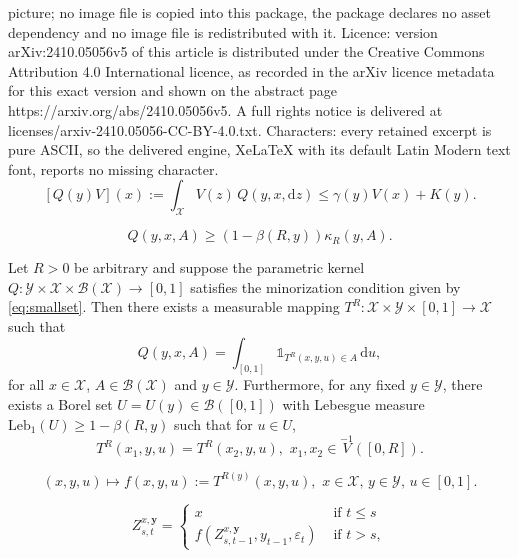 \documentclass[10pt,a4paper]{amsart}
\newcommand{\B}{\mathcal{B}}
\newcommand{\X}{\mathcal{X}}
\newcommand{\Y}{\mathcal{Y}}
\newcommand{\dint}{\mathrm{d}}  %
\newcommand{\eps}{\varepsilon}
\newcommand{\ga}{\gamma}
\newcommand{\ind}{\mathds{1}}
\newcommand{\ka}{\kappa}
\newcommand{\leb}{\mathrm{Leb}}
\begin{document}
picture; no image file is copied into this package, the package declares no asset dependency and no image file is redistributed with it. Licence: version arXiv:2410.05056v5 of this article is distributed under the Creative Commons Attribution 4.0 International licence, as recorded in the arXiv licence metadata for this exact version and shown on the abstract page https://arxiv.org/abs/2410.05056v5. A full rights notice is delivered at licenses/arxiv-2410.05056-CC-BY-4.0.txt. Characters: every retained excerpt is pure ASCII, so the delivered engine, XeLaTeX with its default Latin Modern text font, reports no missing character.
\begin{equation}\label{eq:Lyapunov}
[Q(y)V](x):=\int_{\X}V(z)\,Q(y,x,\dint z)\le \ga (y)V(x)+K(y).
\end{equation}

\begin{equation}\label{eq:smallset}
Q(y,x,A)\ge (1-\beta (R,y))\ka_R (y,A). 
\end{equation}

\begin{lemma}\label{lem:T}
	Let $R>0$ be arbitrary and suppose the parametric kernel $Q:\Y\times\X\times\B(\X)\to [0,1]$ satisfies the minorization condition given by \eqref{eq:smallset}. Then there exists a measurable mapping $T^R:\X\times\Y\times [0,1]\to\X$ such that
	$$
	Q(y,x,A)=\int_{[0,1]}\ind_{T^R (x,y,u)\in A}\,\dint u,
	$$
	for all $x\in\X$, $A\in\B(\X)$ and $y\in\Y$. 
	Furthermore, for any fixed $y\in\Y$, there exists a Borel set $U=U (y)\in \B ([0,1])$
	with Lebesgue measure
	$
	\leb_1 (U)\ge 1-\beta (R,y)
	$
	such that for $u\in U$,
	\begin{equation}\label{eq:Tconst}
	T^R (x_1,y,u) = T^R (x_2,y,u),\,\,x_1,x_2\in\stackrel{-1}{V}([0,R]).
	\end{equation}
\end{lemma}

\begin{equation}\label{eq:fgood}
	(x,y,u)\mapsto f(x,y,u):=T^{R(y)}(x,y,u),\,\,
	x\in\X,\,y\in\Y,\,u\in [0,1].
\end{equation}

\begin{equation}\label{eq:Zaux}
Z_{s,t}^{x,\mathbf{y}} = \begin{cases}
x &\text{ if } t\le s \\
f(Z_{s,t-1}^{x,\mathbf{y}},y_{t-1},\eps_t) &\text{ if } t>s,
\end{cases}
\end{equation}
\end{document}
